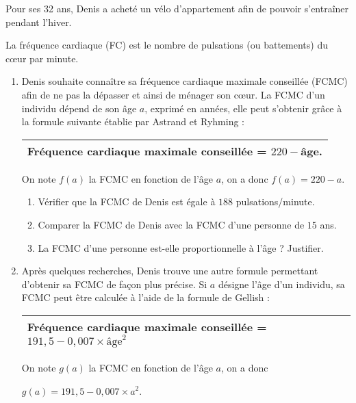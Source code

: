 
Pour ses 32 ans, Denis a acheté un vélo d'appartement afin de pouvoir s'entraîner pendant l'hiver.

La fréquence cardiaque (FC) est le nombre de pulsations (ou battements) du cœur par minute.

\medskip

\begin{enumerate}
\item Denis souhaite connaître sa fréquence cardiaque maximale conseillée (FCMC) afin de ne pas la dépasser et ainsi de ménager son cœur. La FCMC d'un individu dépend de son âge $a$, exprimé en années, elle peut s'obtenir grâce à la formule suivante établie par Astrand et Ryhming :
	
\begin{center}
\begin{tabularx}{0.8\linewidth}{|X|}\hline	
Fréquence cardiaque maximale conseillée = $220 - $âge.\\ \hline
\end{tabularx}
\end{center}

On note $f(a)$ la FCMC en fonction de l'âge $a$, on a donc $f(a) = 220 - a$.
	\begin{enumerate}
		\item Vérifier que la FCMC de Denis est égale à $188$ pulsations/minute. 
		\item Comparer la FCMC de Denis avec la FCMC d'une personne de $15$ ans. 
		\item La FCMC d'une personne est-elle proportionnelle à l'âge ?	Justifier.	 
 	\end{enumerate}
\item  Après quelques recherches, Denis trouve une autre formule permettant d'obtenir sa FCMC de façon plus précise. Si $a$ désigne l'âge d'un individu, sa FCMC peut être calculée à l'aide de la formule de Gellish :
	
\begin{center}
\begin{tabularx}{0.9\linewidth}{|X|}\hline	
Fréquence cardiaque maximale conseillée = $191,5 - 0,007 \times \text{âge}^2$\rule[-3mm]{0mm}{8mm}\\ \hline
\end{tabularx}
\end{center}

On note $g(a)$ la FCMC en fonction de l'âge $a$, on a donc 

$g(a) = 191,5 - 0,007 \times a^2$.


\end{enumerate}
